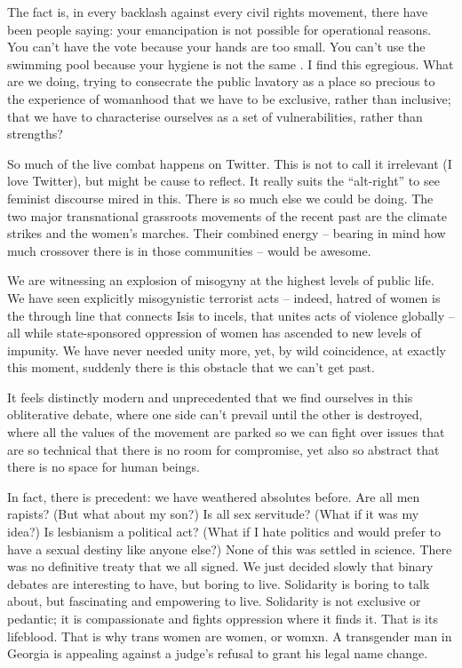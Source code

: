 The fact is, in every backlash against every civil rights movement, there have been people saying: your emancipation is not possible for operational reasons. You can’t have the vote because your hands are too small. You can’t use the swimming pool because your hygiene is not the same . I find this egregious. What are we doing, trying to consecrate the public lavatory as a place so precious to the experience of womanhood that we have to be exclusive, rather than inclusive; that we have to characterise ourselves as a set of vulnerabilities, rather than strengths?

So much of the live combat happens on Twitter. This is not to call it irrelevant (I love Twitter), but might be cause to reflect. It really suits the “alt-right” to see feminist discourse mired in this. There is so much else we could be doing. The two major transnational grassroots movements of the recent past are the climate strikes and the women’s marches. Their combined energy – bearing in mind how much crossover there is in those communities – would be awesome.

We are witnessing an explosion of misogyny at the highest levels of public life. We have seen explicitly misogynistic terrorist acts – indeed, hatred of women is the through line that connects Isis to incels, that unites acts of violence globally – all while state-sponsored oppression of women has ascended to new levels of impunity. We have never needed unity more, yet, by wild coincidence, at exactly this moment, suddenly there is this obstacle that we can’t get past.

It feels distinctly modern and unprecedented that we find ourselves in this obliterative debate, where one side can’t prevail until the other is destroyed, where all the values of the movement are parked so we can fight over issues that are so technical that there is no room for compromise, yet also so abstract that there is no space for human beings.

In fact, there is precedent: we have weathered absolutes before. Are all men rapists? (But what about my son?) Is all sex servitude? (What if it was my idea?) Is lesbianism a political act? (What if I hate politics and would prefer to have a sexual destiny like anyone else?) None of this was settled in science. There was no definitive treaty that we all signed. We just decided slowly that binary debates are interesting to have, but boring to live. Solidarity is boring to talk about, but fascinating and empowering to live. Solidarity is not exclusive or pedantic; it is compassionate and fights oppression where it finds it. That is its lifeblood. That is why trans women are women, or womxn.
A transgender man in Georgia is appealing against a judge’s refusal to grant his legal name change.

